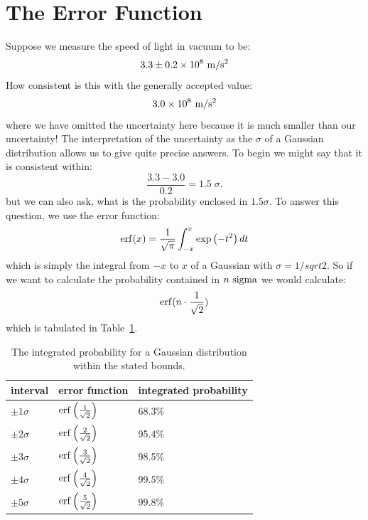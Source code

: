 \documentclass[12pt]{article}
\begin{document}
\section{The Error Function}

Suppose we measure the speed of light in vacuum to be:
\begin{displaymath}
3.3 \pm 0.2 \times 10^8~{\rm m}/{\rm s}^2
\end{displaymath}
How consistent is this with the generally accepted value:
\begin{displaymath}
3.0 \times 10^8~{\rm m}/{\rm s}^2
\end{displaymath}
where we have omitted the uncertainty here because it is much smaller than our uncertainty!   The interpretation of the uncertainty as the $\sigma$ of a Gaussian distribution allows us to give quite precise answers.  To begin we might say that it is consistent within:
\begin{displaymath}
\frac{3.3 - 3.0}{0.2} = 1.5 \; \sigma.
\end{displaymath}
but we can also ask, what is the probability enclosed in $1.5 \sigma$.  To  answer this question, we use the error function:
\begin{displaymath}
{\rm erf}(x) = \frac{1}{\sqrt{\pi}} \int^x_{-x} \exp\left(-t^2 \right) dt
\end{displaymath}
which is simply the integral from $-x$ to $x$ of a Gaussian with $\sigma = 1/sqrt{2}$.  So if we want to calculate the probability contained in $n~\rm sigma$ we would calculate:
\begin{displaymath}
 {\rm erf}(n \cdot \frac{1}{\sqrt{2}})
\end{displaymath}
which is tabulated in Table~\ref{tbl:erf}.\\

\begin{table}[thb]
\begin{center}
\begin{tabular}{lll}
interval & error function & integrated probability \\ 
\hline
$\pm1 \sigma$ & ${\rm erf}\left( \frac{1}{\sqrt{2}} \right)$ & 68.3\% \\
$\pm2 \sigma$ & ${\rm erf}\left( \frac{2}{\sqrt{2}} \right)$ & 95.4\% \\
$\pm3 \sigma$ & ${\rm erf}\left( \frac{3}{\sqrt{2}} \right)$ & 98.5\% \\
$\pm4 \sigma$ & ${\rm erf}\left( \frac{4}{\sqrt{2}} \right)$ & 99.5\% \\
$\pm5 \sigma$ & ${\rm erf}\left( \frac{5}{\sqrt{2}} \right)$ & 99.8\% \\ 
\end{tabular}
\caption{\label{tbl:erf} The integrated probability for a Gaussian distribution within the stated bounds.} 
\end{center}
\end{table}
\end{document}
